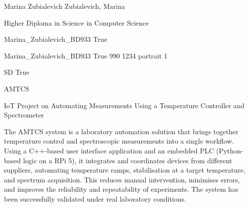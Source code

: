 
\begingroup{}\relax



\def\Key{Marina_Zubialevich_BD933}

{Marina Zubialevich}
{Zubialevich, Marina}

{Higher Diploma in Science in Computer Science}

{Marina_Zubialevich_BD933}
{True}

{Marina_Zubialevich_BD933}
{True}
{990}
{1234}
{portrait}
{1}

{SD}
{True}

{AMTCS}

{IoT Project on Automating Measurements Using a Temperature Controller and Spectrometer}

{The AMTCS system is a laboratory automation solution that brings together temperature control and spectroscopic measurements into a single workflow. Using a C++-based user interface application and an embedded PLC (Python-based logic on a RPi 5), it integrates and coordinates devices from different suppliers, automating temperature ramps, stabilisation at a target temperature, and spectrum acquisition. This reduces manual intervention, minimises errors, and improves the reliability and repeatability of experiments. The system has been successfully validated under real laboratory conditions.}

